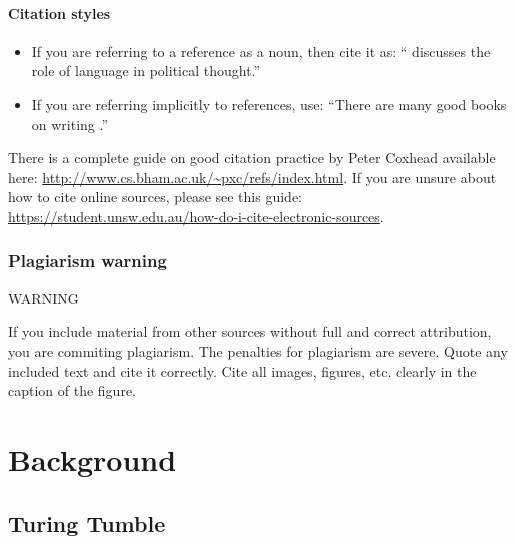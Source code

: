 \documentclass{l4proj}
\begin{document}
\subsubsection{Citation styles}

\begin{itemize}
\item If you are referring to a reference as a noun, then cite it as: ``\citet{Orw68} discusses the role of language in political thought.''
\item If you are referring implicitly to references, use: ``There are many good books on writing \citep{Orw68, Wil09, Pin15}.''
\end{itemize}

There is a complete guide on good citation practice by Peter Coxhead available here: \url{http://www.cs.bham.ac.uk/~pxc/refs/index.html}. 
If you are unsure about how to cite online sources, please see this guide: \url{https://student.unsw.edu.au/how-do-i-cite-electronic-sources}.

\subsection{Plagiarism warning}

\begin{highlight_title}{WARNING}
    
    If you include material from other sources without full and correct attribution, you are commiting plagiarism. The penalties for plagiarism are severe.
    Quote any included text and cite it correctly. Cite all images, figures, etc. clearly in the caption of the figure.
\end{highlight_title}


\chapter{Background}
\section{Turing Tumble}
\end{document}
